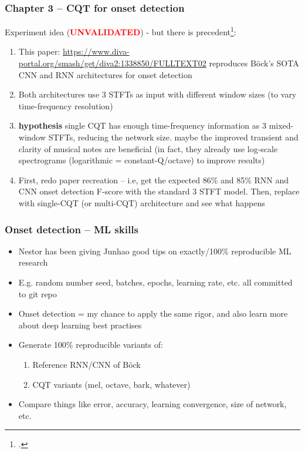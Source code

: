 \documentclass[usenames,dvipsnames]{beamer}
\begin{document}
\begin{frame}
	\frametitle{Chapter 3 -- CQT for onset detection}
	Experiment idea (\textcolor{red}{\textbf{UNVALIDATED}}) - but there is precedent\footcite{beatnsgt}:
	\begin{enumerate}
		\item
			This paper: \href{https://www.diva-portal.org/smash/get/diva2:1338850/FULLTEXT02}{https://www.diva-portal.org/smash/get/diva2:1338850/FULLTEXT02} reproduces B{\"o}ck's SOTA CNN and RNN architectures for onset detection
		\item
			Both architectures use 3 STFTs as input with different window sizes (to vary time-frequency resolution)
		\item
			\textbf{hypothesis} single CQT has enough time-frequency information as 3 mixed-window STFTs, reducing the network size. maybe the improved transient and clarity of musical notes are beneficial (in fact, they already use log-scale spectrograms (logarithmic = constant-Q/octave) to improve results)
		\item
			First, redo paper recreation -- i.e, get the expected 86\% and 85\% RNN and CNN onset detection F-score with the standard 3 STFT model. Then, replace with single-CQT (or multi-CQT) architecture and see what happens
	\end{enumerate}
\end{frame}

\begin{frame}
	\frametitle{Onset detection -- ML skills}
	\begin{itemize}
		\item
			Nestor has been giving Junhao good tips on exactly/100\% reproducible ML research
		\item
			E.g. random number seed, batches, epochs, learning rate, etc. all committed to git repo
		\item
			Onset detection = my chance to apply the same rigor, and also learn more about deep learning best practises
		\item
			Generate 100\% reproducible variants of:
			\begin{enumerate}
				\item
					Reference RNN/CNN of B{\"o}ck
				\item
					CQT variants (mel, octave, bark, whatever)
			\end{enumerate}
		\item
			Compare things like error, accuracy, learning convergence, size of network, etc.
	\end{itemize}
\end{frame}
\end{document}
